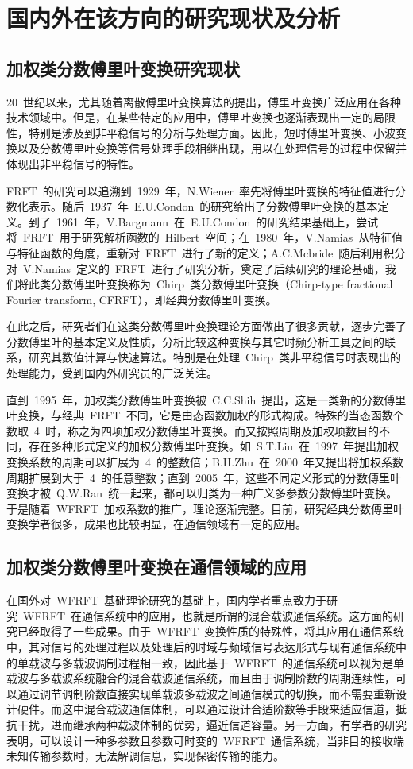 
\section{国内外在该方向的研究现状及分析}
\subsection{加权类分数傅里叶变换研究现状}
20~世纪以来，尤其随着离散傅里叶变换算法的提出，傅里叶变换广泛应用在各种技术领域中。但是，在某些特定的应用中，傅里叶变换也逐渐表现出一定的局限性，特别是涉及到非平稳信号的分析与处理方面。因此，短时傅里叶变换、小波变换以及分数傅里叶变换等信号处理手段相继出现，用以在处理信号的过程中保留并体现出非平稳信号的特性。

FRFT~的研究可以追溯到~1929~年，N.Wiener~率先将傅里叶变换的特征值进行分数化表示。随后~1937~年~E.U.Condon~的研究给出了分数傅里叶变换的基本定义。到了~1961~年，V.Bargmann~在~E.U.Condon~的研究结果基础上，尝试将~FRFT~用于研究解析函数的~Hilbert~空间；在~1980~年，V.Namias~从特征值与特征函数的角度，重新对~FRFT~进行了新的定义；A.C.Mcbride~随后利用积分对~V.Namias~定义的~FRFT~进行了研究分析，奠定了后续研究的理论基础，我们将此类分数傅里叶变换称为~Chirp~类分数傅里叶变换（Chirp-type fractional Fourier transform, CFRFT），即经典分数傅里叶变换。

在此之后，研究者们在这类分数傅里叶变换理论方面做出了很多贡献，逐步完善了分数傅里叶的基本定义及性质，分析比较这种变换与其它时频分析工具之间的联系，研究其数值计算与快速算法。特别是在处理~Chirp~类非平稳信号时表现出的处理能力，受到国内外研究员的广泛关注。

直到~1995~年，加权类分数傅里叶变换被~C.C.Shih~提出，这是一类新的分数傅里叶变换，与经典~FRFT~不同，它是由态函数加权的形式构成。特殊的当态函数个数取~4~时，称之为四项加权分数傅里叶变换。而又按照周期及加权项数目的不同，存在多种形式定义的加权分数傅里叶变换。如~S.T.Liu~在~1997~年提出加权变换系数的周期可以扩展为~4~的整数倍；B.H.Zhu~在~2000~年又提出将加权系数周期扩展到大于~4~的任意整数；直到~2005~年，这些不同定义形式的分数傅里叶变换才被~Q.W.Ran~统一起来，都可以归类为一种广义多参数分数傅里叶变换。于是随着~WFRFT~加权系数的推广，理论逐渐完整。目前，研究经典分数傅里叶变换学者很多，成果也比较明显，在通信领域有一定的应用。


\subsection{加权类分数傅里叶变换在通信领域的应用}
在国外对~WFRFT~基础理论研究的基础上，国内学者重点致力于研究~WFRFT~在通信系统中的应用，也就是所谓的混合载波通信系统。这方面的研究已经取得了一些成果。由于~WFRFT~变换性质的特殊性，将其应用在通信系统中，其对信号的处理过程以及处理后的时域与频域信号表达形式与现有通信系统中的单载波与多载波调制过程相一致，因此基于~WFRFT~的通信系统可以视为是单载波与多载波系统融合的混合载波通信系统，而且由于调制阶数的周期连续性，可以通过调节调制阶数直接实现单载波多载波之间通信模式的切换，而不需要重新设计硬件。而这中混合载波通信体制，可以通过设计合适阶数等手段来适应信道，抵抗干扰，进而继承两种载波体制的优势，逼近信道容量。另一方面，有学者的研究表明，可以设计一种多参数且参数可时变的~WFRFT~通信系统，当非目的接收端未知传输参数时，无法解调信息，实现保密传输的能力。

